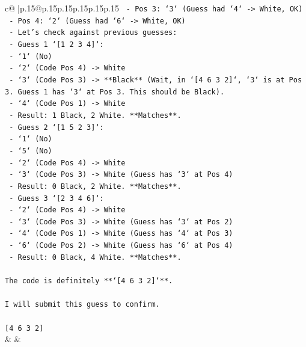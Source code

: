 \documentclass{article}
\begin{document}
{\begin{supertabular}{c@{$\;$}|p{.15\linewidth}@{}p{.15\linewidth}p{.15\linewidth}p{.15\linewidth}p{.15\linewidth}p{.15\linewidth}}
{{{\texttt{    {-} Pos 3: `3` (Guess had `4` {-}> White, OK)} \\
\texttt{    {-} Pos 4: `2` (Guess had `6` {-}> White, OK)} \\
\texttt{    {-} Let's check against previous guesses:} \\
\texttt{        {-} Guess 1 `{[}1 2 3 4{]}`:} \\
\texttt{            {-} `1` (No)} \\
\texttt{            {-} `2` (Code Pos 4) {-}> White} \\
\texttt{            {-} `3` (Code Pos 3) {-}> **Black** (Wait, in `{[}4 6 3 2{]}`, `3` is at Pos 3. Guess 1 has `3` at Pos 3. This should be Black).} \\
\texttt{            {-} `4` (Code Pos 1) {-}> White} \\
\texttt{            {-} Result: 1 Black, 2 White. **Matches**.} \\
\texttt{        {-} Guess 2 `{[}1 5 2 3{]}`:} \\
\texttt{            {-} `1` (No)} \\
\texttt{            {-} `5` (No)} \\
\texttt{            {-} `2` (Code Pos 4) {-}> White} \\
\texttt{            {-} `3` (Code Pos 3) {-}> White (Guess has `3` at Pos 4)} \\
\texttt{            {-} Result: 0 Black, 2 White. **Matches**.} \\
\texttt{        {-} Guess 3 `{[}2 3 4 6{]}`:} \\
\texttt{            {-} `2` (Code Pos 4) {-}> White} \\
\texttt{            {-} `3` (Code Pos 3) {-}> White (Guess has `3` at Pos 2)} \\
\texttt{            {-} `4` (Code Pos 1) {-}> White (Guess has `4` at Pos 3)} \\
\texttt{            {-} `6` (Code Pos 2) {-}> White (Guess has `6` at Pos 4)} \\
\texttt{            {-} Result: 0 Black, 4 White. **Matches**.} \\
\\ 
\texttt{The code is definitely **`{[}4 6 3 2{]}`**.} \\
\\ 
\texttt{I will submit this guess to confirm.} \\
\\ 
\texttt{{[}4 6 3 2{]}} \\
            }
        }
    }
    & & \\ \\


\end{supertabular}}
\end{document}
